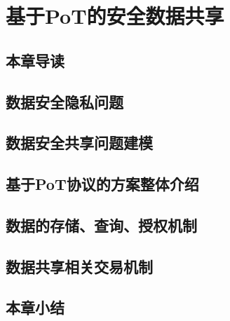 \chapter{基于PoT的安全数据共享}

\section{本章导读}

\section{数据安全隐私问题}

\section{数据安全共享问题建模}

\section{基于PoT协议的方案整体介绍}

\section{数据的存储、查询、授权机制}

\section{数据共享相关交易机制}

\section{本章小结}